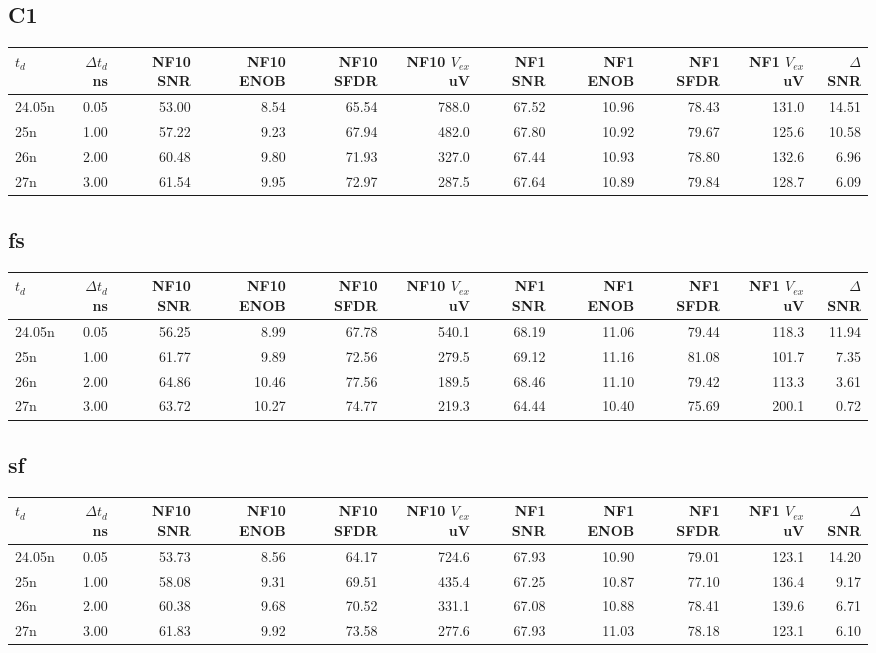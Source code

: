 \documentclass[11pt]{article}
\begin{document}
\subsection*{C1}
{\tiny\setlength{\tabcolsep}{2.5pt}
\begin{longtable}{lrrrrrrrrrr}
\toprule
$t_d$ & $\Delta t_d$ ns & NF10 SNR & NF10 ENOB & NF10 SFDR & NF10 $V_{ex}$ uV & NF1 SNR & NF1 ENOB & NF1 SFDR & NF1 $V_{ex}$ uV & $\Delta$SNR \\
\midrule
\endhead
24.05n & 0.05 & 53.00 & 8.54 & 65.54 & 788.0 & 67.52 & 10.96 & 78.43 & 131.0 & 14.51 \\
25n & 1.00 & 57.22 & 9.23 & 67.94 & 482.0 & 67.80 & 10.92 & 79.67 & 125.6 & 10.58 \\
26n & 2.00 & 60.48 & 9.80 & 71.93 & 327.0 & 67.44 & 10.93 & 78.80 & 132.6 & 6.96 \\
27n & 3.00 & 61.54 & 9.95 & 72.97 & 287.5 & 67.64 & 10.89 & 79.84 & 128.7 & 6.09 \\
\bottomrule
\end{longtable}
}

\subsection*{fs}
{\tiny\setlength{\tabcolsep}{2.5pt}
\begin{longtable}{lrrrrrrrrrr}
\toprule
$t_d$ & $\Delta t_d$ ns & NF10 SNR & NF10 ENOB & NF10 SFDR & NF10 $V_{ex}$ uV & NF1 SNR & NF1 ENOB & NF1 SFDR & NF1 $V_{ex}$ uV & $\Delta$SNR \\
\midrule
\endhead
24.05n & 0.05 & 56.25 & 8.99 & 67.78 & 540.1 & 68.19 & 11.06 & 79.44 & 118.3 & 11.94 \\
25n & 1.00 & 61.77 & 9.89 & 72.56 & 279.5 & 69.12 & 11.16 & 81.08 & 101.7 & 7.35 \\
26n & 2.00 & 64.86 & 10.46 & 77.56 & 189.5 & 68.46 & 11.10 & 79.42 & 113.3 & 3.61 \\
27n & 3.00 & 63.72 & 10.27 & 74.77 & 219.3 & 64.44 & 10.40 & 75.69 & 200.1 & 0.72 \\
\bottomrule
\end{longtable}
}

\subsection*{sf}
{\tiny\setlength{\tabcolsep}{2.5pt}
\begin{longtable}{lrrrrrrrrrr}
\toprule
$t_d$ & $\Delta t_d$ ns & NF10 SNR & NF10 ENOB & NF10 SFDR & NF10 $V_{ex}$ uV & NF1 SNR & NF1 ENOB & NF1 SFDR & NF1 $V_{ex}$ uV & $\Delta$SNR \\
\midrule
\endhead
24.05n & 0.05 & 53.73 & 8.56 & 64.17 & 724.6 & 67.93 & 10.90 & 79.01 & 123.1 & 14.20 \\
25n & 1.00 & 58.08 & 9.31 & 69.51 & 435.4 & 67.25 & 10.87 & 77.10 & 136.4 & 9.17 \\
26n & 2.00 & 60.38 & 9.68 & 70.52 & 331.1 & 67.08 & 10.88 & 78.41 & 139.6 & 6.71 \\
27n & 3.00 & 61.83 & 9.92 & 73.58 & 277.6 & 67.93 & 11.03 & 78.18 & 123.1 & 6.10 \\
\bottomrule
\end{longtable}
}
\end{document}
